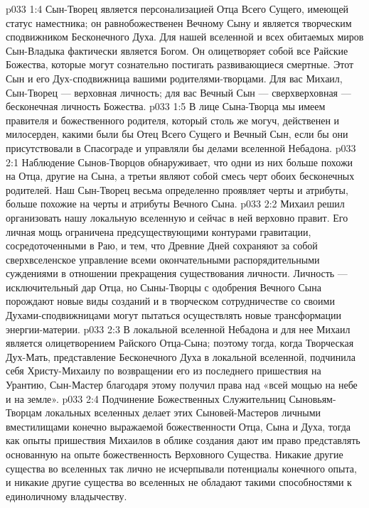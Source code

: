 \vs p033 1:4 Сын\hyp{}Творец является персонализацией Отца Всего Сущего, имеющей статус наместника; он равнобожественен Вечному Сыну и является творческим сподвижником Бесконечного Духа. Для нашей вселенной и всех обитаемых миров Сын\hyp{}Владыка фактически является Богом. Он олицетворяет собой все Райские Божества, которые могут сознательно постигать развивающиеся смертные. Этот Сын и его Дух\hyp{}сподвижница  вашими родителями\hyp{}творцами. Для вас Михаил, Сын\hyp{}Творец --- верховная личность; для вас Вечный Сын --- сверхверховная --- бесконечная личность Божества.
\vs p033 1:5 \pc В лице Сына\hyp{}Творца мы имеем правителя и божественного родителя, который столь же могуч, действенен и милосерден, какими были бы Отец Всего Сущего и Вечный Сын, если бы они присутствовали в Спасограде и управляли бы делами вселенной Небадона.
\vs p033 2:1 Наблюдение Сынов\hyp{}Творцов обнаруживает, что одни из них больше похожи на Отца, другие на Сына, а третьи являют собой смесь черт обоих бесконечных родителей. Наш Сын\hyp{}Творец весьма определенно проявляет черты и атрибуты, больше похожие на черты и атрибуты Вечного Сына.
\vs p033 2:2 Михаил решил организовать нашу локальную вселенную и сейчас в ней верховно правит. Его личная мощь ограничена предсуществующими контурами гравитации, сосредоточенными в Раю, и тем, что Древние Дней сохраняют за собой сверхвселенское управление всеми окончательными распорядительными суждениями в отношении прекращения существования личности. Личность --- исключительный дар Отца, но Сыны\hyp{}Творцы с одобрения Вечного Сына порождают новые виды созданий и в творческом сотрудничестве со своими Духами\hyp{}сподвижницами могут пытаться осуществлять новые трансформации энергии\hyp{}материи.
\vs p033 2:3 \pc В локальной вселенной Небадона и для нее Михаил является олицетворением Райского Отца\hyp{}Сына; поэтому тогда, когда Творческая Дух\hyp{}Мать, представление Бесконечного Духа в локальной вселенной, подчинила себя Христу\hyp{}Михаилу по возвращении его из последнего пришествия на Урантию, Сын\hyp{}Мастер благодаря этому получил права над «всей мощью на небе и на земле».
\vs p033 2:4 Подчинение Божественных Служительниц Сыновьям\hyp{}Творцам локальных вселенных делает этих Сыновей\hyp{}Мастеров личными вместилищами конечно выражаемой божественности Отца, Сына и Духа, тогда как опыты пришествия Михаилов в облике создания дают им право представлять основанную на опыте божественность Верховного Существа. Никакие другие существа во вселенных так лично не исчерпывали потенциалы конечного опыта, и никакие другие существа во вселенных не обладают такими способностями к единоличному владычеству.
